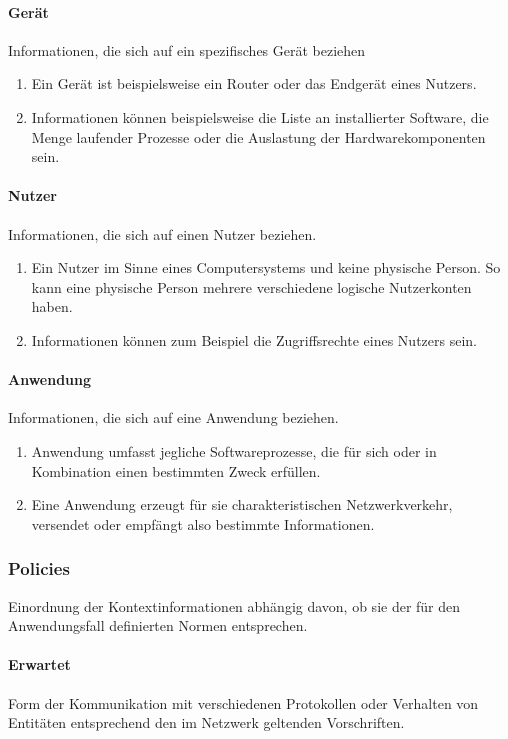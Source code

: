 \paragraph{Gerät}
Informationen, die sich auf ein spezifisches Gerät beziehen
\begin{enumerate}
\item{Ein Gerät ist beispielsweise ein Router oder das Endgerät eines Nutzers. }
\item{Informationen können beispielsweise die Liste an installierter Software, die Menge laufender Prozesse oder die Auslastung der Hardwarekomponenten sein.}
\end{enumerate}
\paragraph{Nutzer}
Informationen, die sich auf einen Nutzer beziehen.
\begin{enumerate}
\item{Ein Nutzer im Sinne eines Computersystems und keine physische Person. So kann eine physische Person mehrere verschiedene logische Nutzerkonten haben. }
\item{Informationen können zum Beispiel die Zugriffsrechte eines Nutzers sein.}
\end{enumerate}
\paragraph{Anwendung}
Informationen, die sich auf eine Anwendung beziehen.
\begin{enumerate}
\item{Anwendung umfasst jegliche Softwareprozesse, die für sich oder in Kombination einen bestimmten Zweck erfüllen.}
\item{Eine Anwendung erzeugt für sie charakteristischen Netzwerkverkehr, versendet oder empfängt also bestimmte Informationen.}
\end{enumerate}
\subsubsection{Policies}
Einordnung der Kontextinformationen abhängig davon, ob sie der für den Anwendungsfall definierten Normen entsprechen.
\paragraph{Erwartet}
Form der Kommunikation mit verschiedenen Protokollen oder Verhalten von Entitäten entsprechend den im Netzwerk geltenden Vorschriften.
